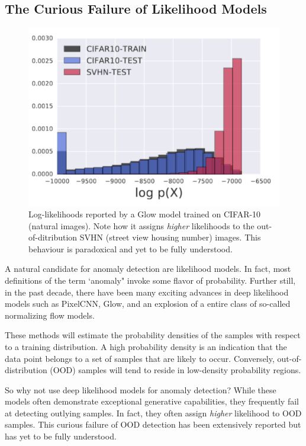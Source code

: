 \subsection*{The Curious Failure of Likelihood Models}

\begin{figure}[tbhp]
    \centering
    \includegraphics[width=.6\textwidth]{figures/cifar_glow_nalisnick.png}
    \caption{Log-likelihoods reported by a Glow model trained on CIFAR-10 (natural images). Note how it assigns \textit{higher} likelihoods to the out-of-ditribution SVHN (street view housing number) images. This behaviour is paradoxical and yet to be fully understood.}
    \label{fig:cifar_glow}
\end{figure}

A natural candidate for anomaly detection are likelihood models. In fact, most definitions of the term `anomaly" invoke some flavor of probability. Further still, in the past decade, there have been many exciting advances in deep likelihood models such as PixelCNN, Glow, and an explosion of a entire class of so-called normalizing flow models.

These methods will estimate the probability densities of the samples with respect to a training distribution. A high probability density is an indication that the data point belongs to a set of samples that are likely to occur.
Conversely, out-of-distribution (OOD) samples will tend to reside in low-density probability regions.


So why not use deep likelihood models for anomaly detection? While these models often demonstrate exceptional generative capabilities, they frequently fail at detecting outlying samples. In fact, they often assign \textit{higher} likelihood to OOD samples. This curious failure of OOD detection has been extensively reported \cite{nalisnick2018do,why_norm_fails,nalisnick2020detecting} but has yet to be fully understood.

